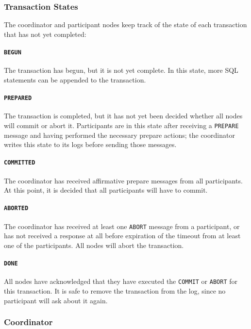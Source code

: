 \documentclass{article}
\begin{document}
\begin{multicols}{2}
\subsubsection{Transaction States}

The coordinator and participant nodes keep track of the state
of each transaction that has not yet completed:

\paragraph{\texttt{BEGUN}} The transaction has begun, but 
it is not yet complete. In this state, more SQL statements
can be appended to the transaction.

\paragraph{\texttt{PREPARED}} The transaction is completed,
but it has not yet been decided whether all nodes will
commit or abort it. Participants are in
this state after receiving a \texttt{PREPARE} message and
having performed the necessary prepare actions; the
coordinator writes this state to its logs before sending 
those messages.

\paragraph{\texttt{COMMITTED}} The coordinator has received
affirmative prepare messages from all participants. At this
point, it is decided that all participants will have to
commit.

\paragraph{\texttt{ABORTED}} The coordinator has received
at least one \texttt{ABORT} message from a participant, or
has not received a response at all before expiration of the
timeout from at least one of the participants. All nodes will
abort the transaction.

\paragraph{\texttt{DONE}} All nodes have acknowledged that
they have executed the \texttt{COMMIT} or \texttt{ABORT} for
this transaction. It is safe to remove the transaction from
the log, since no participant will ask about it again.

\subsubsection{Coordinator}
\label{sec:coordinator}


\end{multicols}
\end{document}
